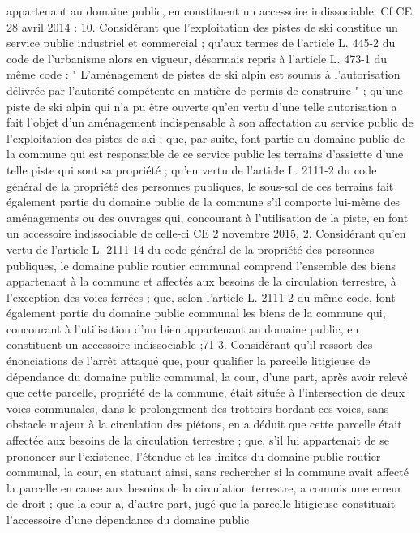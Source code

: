 \documentclass[11pt,a4paper]{report}
\begin{document}
appartenant au domaine public, en constituent un accessoire indissociable.
Cf CE 28 avril 2014  : 10. Considérant que l'exploitation des pistes de ski constitue un
service public industriel et commercial ; qu'aux termes de l'article L. 445-2 du code de l'urbanisme
alors en vigueur, désormais repris à l'article L. 473-1 du même code : " L'aménagement de pistes
de ski alpin est soumis à l'autorisation délivrée par l'autorité compétente en matière de permis de
construire " ; qu'une piste de ski alpin qui n'a pu être ouverte qu'en vertu d'une telle autorisation a
fait l'objet d'un aménagement indispensable à son affectation au service public de l'exploitation des
pistes de ski ; que, par suite, font partie du domaine public de la commune qui est responsable de
ce service public les terrains d'assiette d'une telle piste qui sont sa propriété ; qu'en vertu de
l'article L. 2111-2 du code général de la propriété des personnes publiques, le sous-sol de ces
terrains fait également partie du domaine public de la commune s'il comporte lui-même des
aménagements ou des ouvrages qui, concourant à l'utilisation de la piste, en font un accessoire
indissociable de celle-ci
CE 2 novembre 2015,  2. Considérant qu'en vertu de l'article L. 2111-14 du code
général de la propriété des personnes publiques, le domaine public routier communal comprend
l'ensemble des biens appartenant à la commune et affectés aux besoins de la circulation terrestre, à
l'exception des voies ferrées ; que, selon l'article L. 2111-2 du même code, font également partie du
domaine public communal les biens de la commune qui, concourant à l'utilisation d'un bien
appartenant au domaine public, en constituent un accessoire indissociable ;71
3. Considérant qu'il ressort des énonciations de l'arrêt attaqué que, pour qualifier la parcelle
litigieuse de dépendance du domaine public communal, la cour, d'une part, après avoir relevé que
cette parcelle, propriété de la commune, était située à l'intersection de deux voies communales,
dans le prolongement des trottoirs bordant ces voies, sans obstacle majeur à la circulation des
piétons, en a déduit que cette parcelle était affectée aux besoins de la circulation terrestre ; que, s'il
lui appartenait de se prononcer sur l'existence, l'étendue et les limites du domaine public routier
communal, la cour, en statuant ainsi, sans rechercher si la commune avait affecté la parcelle en
cause aux besoins de la circulation terrestre, a commis une erreur de droit ; que la cour a, d'autre
part, jugé que la parcelle litigieuse constituait l'accessoire d'une dépendance du domaine public
\end{document}
